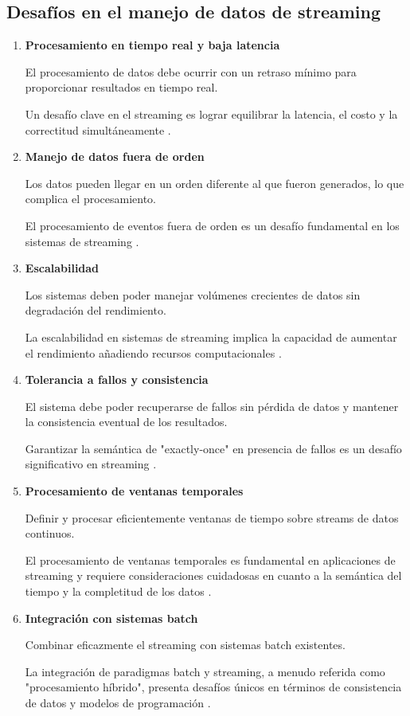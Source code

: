 \newpage

\subsection{Desafíos en el manejo de datos de streaming}

\begin{enumerate}
    \item \textbf{Procesamiento en tiempo real y baja latencia}
    
    El procesamiento de datos debe ocurrir con un retraso mínimo para proporcionar resultados en tiempo real.
    
    Un desafío clave en el streaming es lograr equilibrar la latencia, el costo y la correctitud simultáneamente \parencite{akidau2015dataflow}.

    \item \textbf{Manejo de datos fuera de orden}
    
    Los datos pueden llegar en un orden diferente al que fueron generados, lo que complica el procesamiento.
    
    El procesamiento de eventos fuera de orden es un desafío fundamental en los sistemas de streaming \parencite[p.~87]{flink}.

    \item \textbf{Escalabilidad}
    
    Los sistemas deben poder manejar volúmenes crecientes de datos sin degradación del rendimiento.
    
    La escalabilidad en sistemas de streaming implica la capacidad de aumentar el rendimiento añadiendo recursos computacionales \parencite{samurai}.

    \newpage
    \item \textbf{Tolerancia a fallos y consistencia}
    
    El sistema debe poder recuperarse de fallos sin pérdida de datos y mantener la consistencia eventual de los resultados.
    
    Garantizar la semántica de "exactly-once" en presencia de fallos es un desafío significativo en streaming \parencite{carbone2015apache}.

    \item \textbf{Procesamiento de ventanas temporales}
    
    Definir y procesar eficientemente ventanas de tiempo sobre streams de datos continuos.
    
    El procesamiento de ventanas temporales es fundamental en aplicaciones de streaming y requiere consideraciones cuidadosas en cuanto a la semántica del tiempo y la completitud de los datos \parencite{akidau2015dataflow}.

    \item \textbf{Integración con sistemas batch}
    
    Combinar eficazmente el streaming con sistemas batch existentes.
    
    La integración de paradigmas batch y streaming, a menudo referida como "procesamiento híbrido", presenta desafíos únicos en términos de consistencia de datos y modelos de programación \parencite{carbone2015apache}.
\end{enumerate}
\newpage
